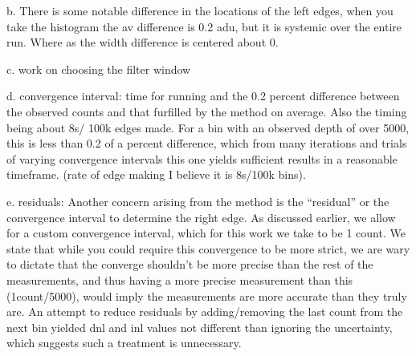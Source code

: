 \documentclass[11pt, letterpaper]{article}
\begin{document}
b. There is some notable difference in the locations of the left edges, when you take the histogram the av difference is 0.2 adu, but it is systemic over the entire run. Where as the width difference is centered about 0. 

c. work on choosing the filter window 

d. convergence interval: time for running and the 0.2 percent difference between the observed counts and that furfilled by the method on average. Also the timing being about 8s/ 100k edges made. For a bin with an observed depth of over 5000, this is less than 0.2 of a percent difference, which from many iterations and trials of varying convergence intervals this one yields sufficient results in a reasonable timeframe. (rate of edge making I believe it is 8s/100k bins). 


e. residuals: Another concern arising from the method is the “residual” or the convergence interval to determine the right edge. 
As discussed earlier, we allow for a custom convergence interval, which for this work we take to be 1 count. 
We state that while you could require this convergence to be more strict, we are wary to dictate that the converge shouldn’t be more precise than the rest of the measurements, and thus having a more precise measurement than this (1count/5000), would imply the measurements are more accurate than they truly are. 
An attempt to reduce residuals by adding/removing the last count from the next bin yielded dnl and inl values not different than ignoring the uncertainty, which suggests such a treatment is unnecessary. 
\end{document}
